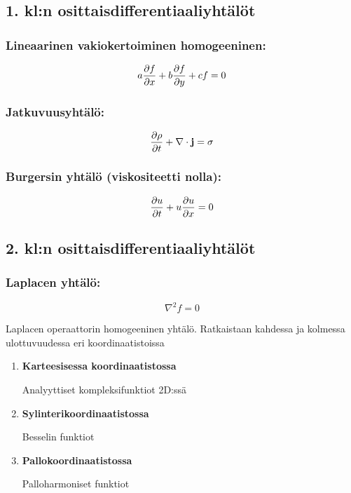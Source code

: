 \documentclass[../johdoksia.tex]{subfiles}
\begin{document}
	\subsection{1. kl:n osittaisdifferentiaaliyhtälöt}
	
	\subsubsection{Lineaarinen vakiokertoiminen homogeeninen:}
	
	\begin{equation}
		a\pdv{f}{x} + b\pdv{f}{y} + cf = 0
	\end{equation}
	
	\subsubsection{Jatkuvuusyhtälö:}
	
	\begin{equation}
		\pdv{\rho}{t} + \nabla\cdot\mathbf{j} = \sigma
	\end{equation}
	
	\subsubsection{Burgersin yhtälö (viskositeetti nolla):}
	
	\begin{equation}
		\pdv{u}{t} + u\pdv{u}{x} = 0
	\end{equation}
	
	
	\subsection{2. kl:n osittaisdifferentiaaliyhtälöt}
	
	\subsubsection{Laplacen yhtälö:}
	
	\begin{equation}
		\nabla^2f = 0
	\end{equation}

	Laplacen operaattorin homogeeninen yhtälö. Ratkaistaan kahdessa ja kolmessa ulottuvuudessa eri koordinaatistoissa

	\begin{enumerate}
		\item \textbf{Karteesisessa koordinaatistossa}
		
		Analyyttiset kompleksifunktiot 2D:ssä
		
		\item \textbf{Sylinterikoordinaatistossa}
		
		Besselin funktiot
		
		\item \textbf{Pallokoordinaatistossa}
		
		Palloharmoniset funktiot
	\end{enumerate}
	
\end{document}
